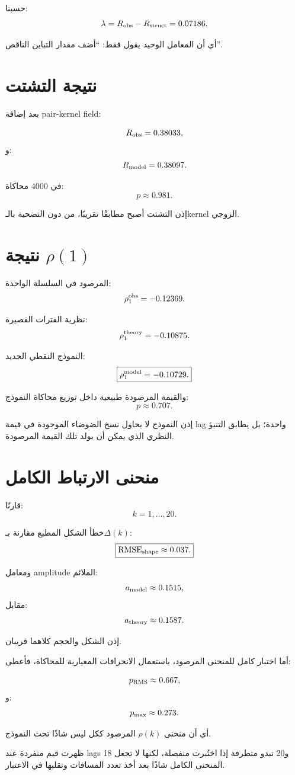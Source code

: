 \documentclass[12pt]{article}
\begin{document}
حسبنا:
\[
\lambda
=
R_{\rm obs}-R_{\rm struct}
=
0.07186.
\]

أي أن المعامل الوحيد يقول فقط:
``أضف مقدار التباين الناقص''.

\section{نتيجة التشتت}

بعد إضافة pair-kernel field:

\[
R_{\rm obs}=0.38033,
\]
و:
\[
R_{\rm model}=0.38097.
\]

في \(4000\) محاكاة:
\[
p\approx0.981.
\]

إذن التشتت أصبح مطابقًا تقريبًا، من دون التضحية بالـkernel الزوجي.

\section{نتيجة \(\rho(1)\)}

المرصود في السلسلة الواحدة:
\[
\rho_1^{\rm obs}=-0.12369.
\]

نظرية الفترات القصيرة:
\[
\rho_1^{\rm theory}=-0.10875.
\]

النموذج النقطي الجديد:
\[
\boxed{
\rho_1^{\rm model}=-0.10729.
}
\]

والقيمة المرصودة طبيعية داخل توزيع محاكاة النموذج:
\[
p\approx0.707.
\]

إذن النموذج لا يحاول نسخ الضوضاء الموجودة في قيمة lag واحدة؛
بل يطابق التنبؤ النظري الذي يمكن أن يولد تلك القيمة المرصودة.

\section{منحنى الارتباط الكامل}

قارنّا:
\[
k=1,\ldots,20.
\]

خطأ الشكل المطبع مقارنة بـ\(\Delta(k)\):
\[
\boxed{
\mathrm{RMSE}_{\rm shape}\approx0.037.
}
\]

ومعامل amplitude الملائم:
\[
a_{\rm model}\approx0.1515,
\]
مقابل:
\[
a_{\rm theory}\approx0.1587.
\]

إذن الشكل والحجم كلاهما قريبان.

أما اختبار كامل للمنحنى المرصود، باستعمال الانحرافات المعيارية للمحاكاة،
فأعطى:

\[
p_{\rm RMS}\approx0.667,
\]
و:
\[
p_{\rm max}\approx0.273.
\]

أي أن منحنى \(\rho(k)\) المرصود ككل ليس شاذًا تحت النموذج.

ظهرت قيم منفردة عند lags 18 و20 تبدو متطرفة إذا اختُبرت منفصلة،
لكنها لا تجعل المنحنى الكامل شاذًا بعد أخذ تعدد المسافات وتقلبها في الاعتبار.
\end{document}
